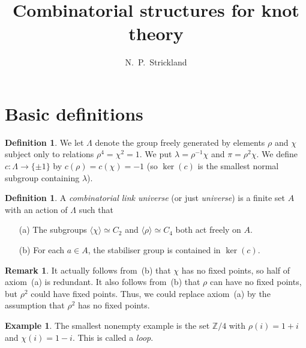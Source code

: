 \documentclass{amsart}
\newcommand{\Z}         {{\mathbb{Z}}}
\newcommand{\Lm}        {\Lambda}
\newcommand{\lm}        {\lambda}
\newcommand{\ip}[1]     {\langle #1\rangle}
\renewcommand{\:}{\colon}
\theoremstyle{definition}
\newtheorem{remark}[theorem]{Remark}
\newtheorem{definition}[theorem]{Definition}
\newtheorem{example}[theorem]{Example}
\begin{document}
\title{Combinatorial structures for knot theory}
\author{N.~P.~Strickland}

\maketitle 

\section{Basic definitions}

\begin{definition}
 We let $\Lm$ denote the group freely generated by elements $\rho$ and
 $\chi$ subject only to relations $\rho^4=\chi^2=1$.  We put
 $\lm=\rho^{-1}\chi$ and $\pi=\rho^2\chi$.  We define
 $c\:\Lm\to\{\pm 1\}$ by $c(\rho)=c(\chi)=-1$ (so $\ker(c)$ is the
 smallest normal subgroup containing $\lm$).  
\end{definition}

\begin{definition}\label{defn-universe}
 A \emph{combinatorial link universe} (or just \emph{universe}) is a
 finite set $A$ with an action of $\Lm$ such that 
 \begin{itemize}
  \item[(a)] The subgroups $\ip{\chi}\simeq C_2$ and $\ip{\rho}\simeq C_4$
   both act freely on $A$.
  \item[(b)] For each $a\in A$, the stabiliser group is contained in
   $\ker(c)$. 
 \end{itemize}
\end{definition}

\begin{remark}\label{rem-rho-squared}
 It actually follows from~(b) that $\chi$ has no fixed points, so half
 of axiom~(a) is redundant.  It also follows from~(b) that $\rho$ can
 have no fixed points, but $\rho^2$ could have fixed points.  Thus, we
 could replace axiom~(a) by the assumption that $\rho^2$ has no fixed
 points. 
\end{remark}

\begin{example}\label{eg-loop}
 The smallest nonempty example is the set $\Z/4$ with $\rho(i)=1+i$
 and $\chi(i)=1-i$.  This is called a \emph{loop}.
\end{example}
\end{document}

